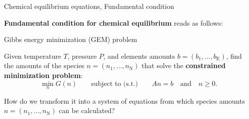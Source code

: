 %
\begin{frame}{Chemical equilibrium equations, Fundamental condition}

\alert{\textbf{Fundamental condition for chemical equilibrium}} reads as follows:
\vskip 5pt
%
\begin{cbox}{Gibbs energy minimization (GEM) problem}

Given temperature $T$, pressure $P$, and elements amounts ${b=(b_{1},\ldots,b_{\text{E}})}$,
find the amounts of the species ${n=(n_{1},\ldots,n_{\text{N}})}$
that solve the \textbf{constrained minimization problem}:
\[
\min_{n}G(n)\qquad\text{subject to (s.t.)}\qquad An=b\quad\text{and}\quad n\geq0.
\]

\end{cbox}
\vskip 5pt
%
\begin{center}
How do we transform it into a system of equations from which species amounts $n=(n_{1},\ldots,n_{\text{N}})$ can be calculated?
\end{center}

\end{frame}
%
